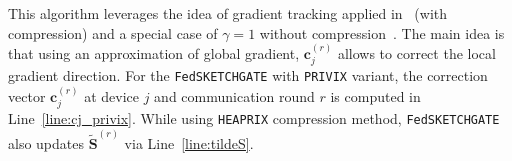 \documentclass[twoside]{article}
\begin{document}
This algorithm leverages the idea of gradient tracking applied in~\cite{haddadpour2020federated} (with compression) and a special case of $\gamma=1$ without compression~\cite{liang2019variance}. 
The main idea is that using an approximation of global gradient, $\mathbf{c}_j^{(r)}$ allows to correct the local gradient direction. 
For the \texttt{FedSKETCHGATE} with \texttt{PRIVIX} variant, the correction vector $\mathbf{c}_j^{(r)}$ at device $j$ and communication round $r$ is computed in Line~\ref{line:cj_privix}. 
While using \texttt{HEAPRIX} compression method, \texttt{FedSKETCHGATE} also updates $\tilde{\mathbf{S}}^{(r)}$ via Line~\ref{line:tildeS}.
\end{document}
